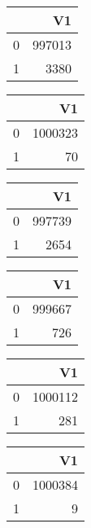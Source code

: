 \bigskip\bigskip
\centering
\begin{tabular}{rr}
  \hline
 & V1 \\ 
  \hline
0 & 997013 \\ 
  1 & 3380 \\ 
   \hline
\end{tabular}

\bigskip\bigskip
\centering
\begin{tabular}{rr}
  \hline
 & V1 \\ 
  \hline
0 & 1000323 \\ 
  1 &  70 \\ 
   \hline
\end{tabular}

\bigskip\bigskip
\centering
\begin{tabular}{rr}
  \hline
 & V1 \\ 
  \hline
0 & 997739 \\ 
  1 & 2654 \\ 
   \hline
\end{tabular}

\bigskip\bigskip
\centering
\begin{tabular}{rr}
  \hline
 & V1 \\ 
  \hline
0 & 999667 \\ 
  1 & 726 \\ 
   \hline
\end{tabular}

\bigskip\bigskip
\centering
\begin{tabular}{rr}
  \hline
 & V1 \\ 
  \hline
0 & 1000112 \\ 
  1 & 281 \\ 
   \hline
\end{tabular}

\bigskip\bigskip
\centering
\begin{tabular}{rr}
  \hline
 & V1 \\ 
  \hline
0 & 1000384 \\ 
  1 &   9 \\ 
   \hline
\end{tabular}

